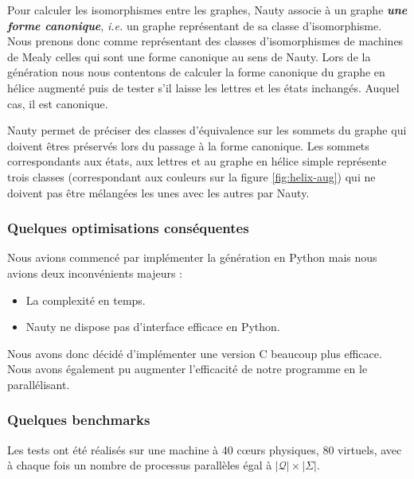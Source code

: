 \documentclass[11pt,a4paper]{article}
\begin{document}
Pour calculer les isomorphismes entre les graphes, \textrm{Nauty} associe à un graphe \textit{\textbf{une forme canonique}}, \emph{i.e.} un graphe représentant de sa classe d'isomorphisme. Nous prenons donc comme représentant des classes d'isomorphismes de machines de Mealy celles qui sont une forme canonique au sens de \textrm{Nauty}. Lors de la génération nous nous contentons de calculer la forme canonique du graphe en hélice augmenté puis de tester s'il laisse les lettres et les états inchangés. Auquel cas, il est canonique.

Nauty permet de préciser des classes d'équivalence sur les sommets du graphe qui doivent êtres préservés lors du passage à la forme canonique. Les sommets correspondants aux états, aux lettres et au graphe en hélice simple représente trois classes (correspondant aux couleurs sur la figure \ref{fig:helix-aug}) qui ne doivent pas être mélangées les unes avec les autres par \textrm{Nauty}.

\subsubsection*{Quelques optimisations conséquentes}
Nous avions commencé par implémenter la génération en \textrm{Python} mais nous avions deux inconvénients majeurs :
\begin{itemize}
\item La complexité en temps.
\item \textrm{Nauty} ne dispose pas d'interface efficace en Python.
\end{itemize}

Nous avons donc décidé d'implémenter une version C beaucoup plus efficace. Nous avons également pu augmenter l'efficacité de notre programme en le parallélisant.

\subsubsection*{Quelques benchmarks}

Les tests ont été réalisés sur une machine à 40 cœurs physiques, 80 virtuels, avec à chaque fois un nombre de processus parallèles égal à $|\mathcal{Q}|\times|\Sigma|$. 
\end{document}
